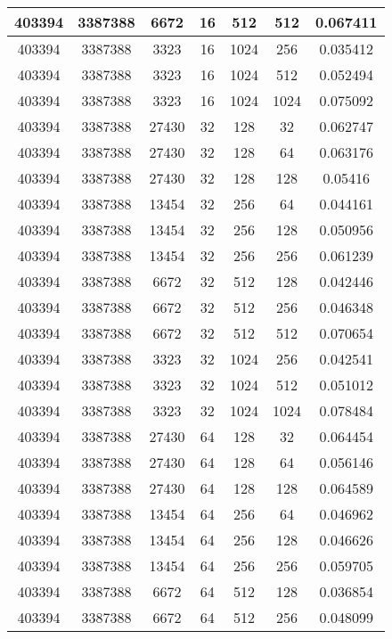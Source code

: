 \documentclass[9pt]{article}
\begin{document}
\begin{tabular}{|c|c|c|c|c|c|c| }
403394  & 3387388  & 6672  & 16  & 512  & 512  & 0.067411 \\
\hline
403394  & 3387388  & 3323  & 16  & 1024  & 256  & 0.035412 \\
\hline
403394  & 3387388  & 3323  & 16  & 1024  & 512  & 0.052494 \\
\hline
403394  & 3387388  & 3323  & 16  & 1024  & 1024  & 0.075092 \\
\hline
403394  & 3387388  & 27430  & 32  & 128  & 32  & 0.062747 \\
\hline
403394  & 3387388  & 27430  & 32  & 128  & 64  & 0.063176 \\
\hline
403394  & 3387388  & 27430  & 32  & 128  & 128  & 0.05416 \\
\hline
403394  & 3387388  & 13454  & 32  & 256  & 64  & 0.044161 \\
\hline
403394  & 3387388  & 13454  & 32  & 256  & 128  & 0.050956 \\
\hline
403394  & 3387388  & 13454  & 32  & 256  & 256  & 0.061239 \\
\hline
403394  & 3387388  & 6672  & 32  & 512  & 128  & 0.042446 \\
\hline
403394  & 3387388  & 6672  & 32  & 512  & 256  & 0.046348 \\
\hline
403394  & 3387388  & 6672  & 32  & 512  & 512  & 0.070654 \\
\hline
403394  & 3387388  & 3323  & 32  & 1024  & 256  & 0.042541 \\
\hline
403394  & 3387388  & 3323  & 32  & 1024  & 512  & 0.051012 \\
\hline
403394  & 3387388  & 3323  & 32  & 1024  & 1024  & 0.078484 \\
\hline
403394  & 3387388  & 27430  & 64  & 128  & 32  & 0.064454 \\
\hline
403394  & 3387388  & 27430  & 64  & 128  & 64  & 0.056146 \\
\hline
403394  & 3387388  & 27430  & 64  & 128  & 128  & 0.064589 \\
\hline
403394  & 3387388  & 13454  & 64  & 256  & 64  & 0.046962 \\
\hline
403394  & 3387388  & 13454  & 64  & 256  & 128  & 0.046626 \\
\hline
403394  & 3387388  & 13454  & 64  & 256  & 256  & 0.059705 \\
\hline
403394  & 3387388  & 6672  & 64  & 512  & 128  & 0.036854 \\
\hline
403394  & 3387388  & 6672  & 64  & 512  & 256  & 0.048099 \\
\hline

\end{tabular}
\end{document}
